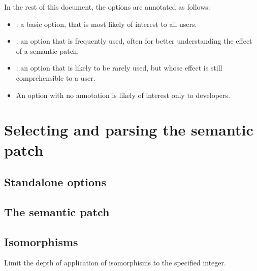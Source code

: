 In the rest of this document, the options are annotated as follows:
\begin{itemize}
\item \FilledBigDiamondshape: a basic option, that is most likely of
  interest to all users.
\item \BigLowerDiamond: an option that is frequently used, often for better
understanding the effect of a semantic patch.
\item \BigDiamondshape: an option that is likely to be rarely used, but
  whose effect is still comprehensible to a user.
\item An option with no annotation is likely of interest only to
  developers.
\end{itemize}

\section{Selecting and parsing the semantic patch}

\subsection{Standalone options}


\subsection{The semantic patch}


\subsection{Isomorphisms}


 Limit the depth of application of
isomorphisms to the specified integer.

